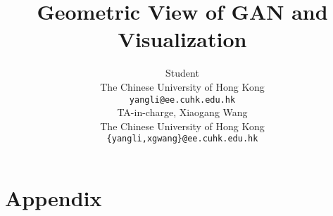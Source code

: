 \documentclass{article}
\title{Geometric View of GAN and Visualization}
\author{
    Student \\
    The Chinese University of Hong Kong\\
    \texttt{yangli@ee.cuhk.edu.hk} \\
     \And
     TA-in-charge, Xiaogang Wang \\
     The Chinese University of Hong Kong \\
     \texttt{\{yangli,xgwang\}@ee.cuhk.edu.hk} \\
}
\begin{document}
\maketitle













\clearpage
\section*{Appendix}
\end{document}

